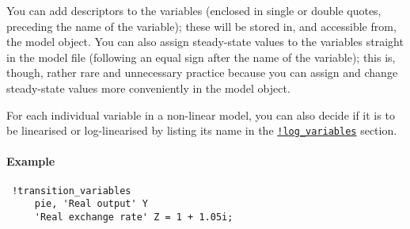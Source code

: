  You can add descriptors to the variables (enclosed in single or double
 quotes, preceding the name of the variable); these will be stored in,
 and accessible from, the model object. You can also assign steady-state
 values to the variables straight in the model file (following an equal
 sign after the name of the variable); this is, though, rather rare and
 unnecessary practice because you can assign and change steady-state
 values more conveniently in the model object.
 
 For each individual variable in a non-linear model, you can also decide
 if it is to be linearised or log-linearised by listing its name in the
 \href{modellang/logvariables}{\texttt{!log\_variables}} section.
 
 \paragraph{Example}
 
 \begin{verbatim}
 !transition_variables
     pie, 'Real output' Y
     'Real exchange rate' Z = 1 + 1.05i;
 \end{verbatim}


